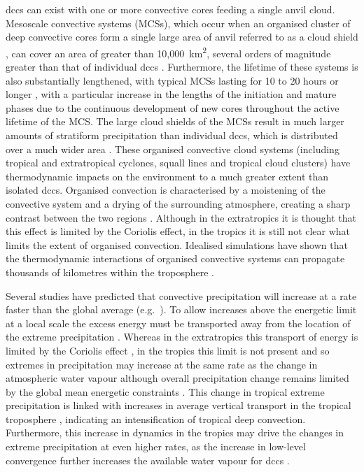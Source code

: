 \acrshort{dcc}s can exist with one or more convective cores feeding a single anvil cloud.
Mesoscale convective systems (MCSs), which occur when an organised cluster of deep convective cores form a single large area of anvil referred to as a cloud shield \citep{roca_simple_2017}, can cover an area of greater than 10,000~km\textsuperscript{2}, several orders of magnitude greater than that of individual \acrshort{dcc}s \citep{houze_mesoscale_2004}.
Furthermore, the lifetime of these systems is also substantially lengthened, with typical MCSs lasting for 10 to 20 hours or longer \citep{chen_diurnal_1997}, with a particular increase in the lengths of the initiation and mature phases \citep{wall_life_2018} due to the continuous development of new cores throughout the active lifetime of the MCS.
The large cloud shields of the MCSs result in much larger amounts of stratiform precipitation than individual \acrshort{dcc}s, which is distributed over a much wider area \citep{houze_chapter_2014}.
These organised convective cloud systems (including tropical and extratropical cyclones, squall lines and tropical cloud clusters) have thermodynamic impacts on the environment to a much greater extent than isolated \acrshort{dcc}s.
Organised convection is characterised by a moistening of the convective system and a drying of the surrounding atmosphere, creating a sharp contrast between the two regions \citep{houze_chapter_2014}.
Although in the extratropics it is thought that this effect is limited by the Coriolis effect, in the tropics it is still not clear what limits the extent of organised convection.
Idealised simulations have shown that the thermodynamic interactions of organised convective systems can propagate thousands of kilometres within the troposphere \citep{beucler_budget_2019}.

Several studies have predicted that convective precipitation will increase at a rate faster than the global average (e.g.\ \citet{ogorman_physical_2009, muller_intensification_2011, ogorman_precipitation_2015, donat_more_2016}).
To allow increases above the energetic limit at a local scale the excess energy must be transported away from the location of the extreme precipitation \citep{muller_energetic_2011}.
Whereas in the extratropics this transport of energy is limited by the Coriolis effect \citep{ogorman_physical_2009}, in the tropics this limit is not present and so extremes in precipitation may increase at the same rate as the change in atmospheric water vapour \citep{ogorman_energetic_2012} although overall precipitation change remains limited by the global mean energetic constraints \citep{allen_constraints_2002}.
This change in tropical extreme precipitation is linked with increases in average vertical transport in the tropical troposphere \citep{muller_energetic_2011}, indicating an intensification of tropical deep convection.
Furthermore, this increase in dynamics in the tropics may drive the changes in extreme precipitation at even higher rates, as the increase in low-level convergence further increases the available water vapour for \acrshort{dcc}s \citep{ogorman_energetic_2012}.

